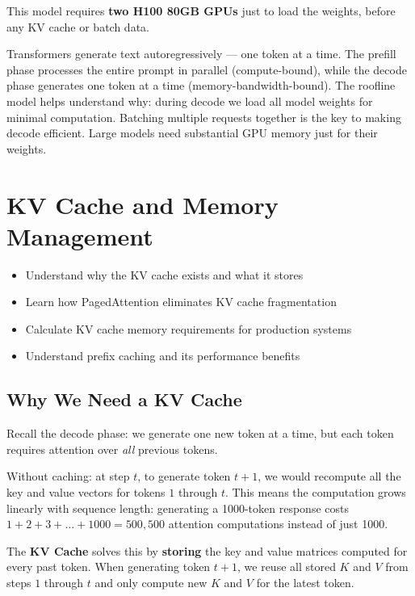 \documentclass[11pt, twoside, openright]{book}
\newenvironment{learningobjectives}
  {\begin{tcolorbox}[enhanced, breakable,
    colback={rgb,255:red,232;green,240;blue,255},
    colframe=NavyBlue, boxrule=1.5pt, arc=4pt,
    title={\bfseries Learning Objectives},
    fonttitle=\bfseries\color{white},
    attach boxed title to top left={yshift=-2mm, xshift=5mm},
    boxed title style={colback=NavyBlue, arc=2pt}]
  \begin{itemize}[leftmargin=1.5em, itemsep=2pt]}
  {\end{itemize}\end{tcolorbox}}
\newenvironment{chapsummary}
  {\begin{tcolorbox}[enhanced, breakable,
    colback={rgb,255:red,245;green,245;blue,225},
    colframe=AccentOrange, boxrule=1.5pt, arc=4pt,
    title={\bfseries Chapter Summary},
    fonttitle=\bfseries\color{white},
    attach boxed title to top left={yshift=-2mm, xshift=5mm},
    boxed title style={colback=AccentOrange, arc=2pt}]}
  {\end{tcolorbox}}
\newcommand{\keyterm}[1]{\textbf{\color{AccentOrange}#1}}
\begin{document}
This model requires \textbf{two H100 80GB GPUs} just to load the weights, before
any KV cache or batch data.

\begin{chapsummary}
Transformers generate text autoregressively --- one token at a time.  The prefill
phase processes the entire prompt in parallel (compute-bound), while the decode
phase generates one token at a time (memory-bandwidth-bound).  The roofline model
helps understand why: during decode we load all model weights for minimal
computation.  Batching multiple requests together is the key to making decode
efficient.  Large models need substantial GPU memory just for their weights.
\end{chapsummary}

\chapter{KV Cache and Memory Management}
\label{ch:kvcache}

\begin{learningobjectives}
  \item Understand why the KV cache exists and what it stores
  \item Learn how PagedAttention eliminates KV cache fragmentation
  \item Calculate KV cache memory requirements for production systems
  \item Understand prefix caching and its performance benefits
\end{learningobjectives}

\section{Why We Need a KV Cache}

Recall the decode phase: we generate one new token at a time, but each token
requires attention over \emph{all} previous tokens.

Without caching: at step $t$, to generate token $t+1$, we would recompute
all the key and value vectors for tokens $1$ through $t$.  This means
the computation grows linearly with sequence length: generating a 1000-token
response costs $1+2+3+\ldots+1000 = 500{,}500$ attention computations instead
of just 1000.

The \keyterm{KV Cache} solves this by \textbf{storing} the key
and value matrices computed for every past token.  When generating token $t+1$,
we reuse all stored $K$ and $V$ from steps $1$ through $t$ and only compute
new $K$ and $V$ for the latest token.
\end{document}
